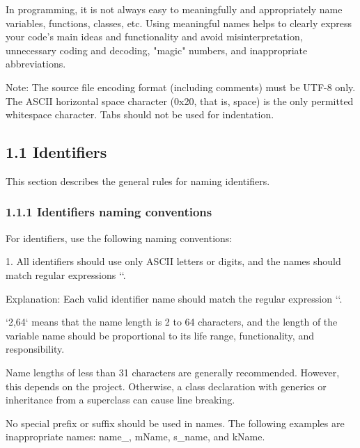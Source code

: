\label{sec:1.}

In programming, it is not always easy to meaningfully and appropriately name variables, functions, classes, etc. Using meaningful names helps to clearly express your code's main ideas and functionality and avoid misinterpretation, unnecessary coding and decoding, "magic" numbers, and inappropriate abbreviations.



Note: The source file encoding format (including comments) must be UTF-8 only. The ASCII horizontal space character (0x20, that is, space) is the only permitted whitespace character. Tabs should not be used for indentation.



\subsection*{\textbf{1.1 Identifiers}}

\label{sec:1.1}

This section describes the general rules for naming identifiers.

\subsubsection*{\textbf{1.1.1 Identifiers naming conventions}}
\leavevmode\newline

\label{sec:1.1.1}



For identifiers, use the following naming conventions:

1.	All identifiers should use only ASCII letters or digits, and the names should match regular expressions ``.

Explanation: Each valid identifier name should match the regular expression ``.

`{2,64}` means that the name length is 2 to 64 characters, and the length of the variable name should be proportional to its life range, functionality, and responsibility.

Name lengths of less than 31 characters are generally recommended. However, this depends on the project. Otherwise, a class declaration with generics or inheritance from a superclass can cause line breaking.

No special prefix or suffix should be used in names. The following examples are inappropriate names: name\_, mName, s\_name, and kName.



